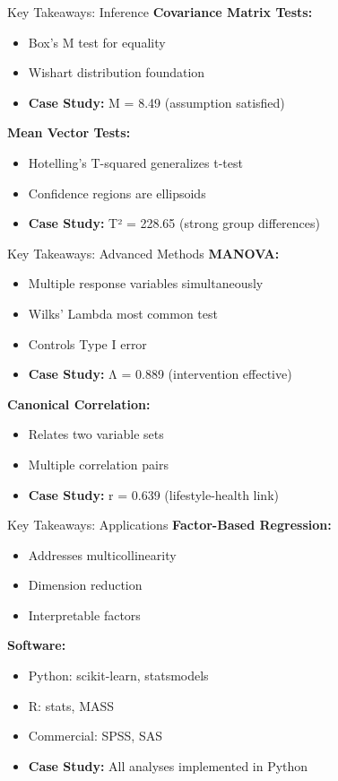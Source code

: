 \documentclass[aspectratio=169,ignorenonframetext]{beamer}
\begin{document}
\begin{frame}{Key Takeaways: Inference}
\textbf{Covariance Matrix Tests:}

\begin{itemize}
\item
  Box's M test for equality
\item
  Wishart distribution foundation
\item
  \textbf{Case Study:} M = 8.49 (assumption satisfied)
\end{itemize}

\textbf{Mean Vector Tests:}

\begin{itemize}
\item
  Hotelling's T-squared generalizes t-test
\item
  Confidence regions are ellipsoids
\item
  \textbf{Case Study:} T² = 228.65 (strong group differences)
\end{itemize}
\end{frame}

\begin{frame}{Key Takeaways: Advanced Methods}
\textbf{MANOVA:}

\begin{itemize}
\item
  Multiple response variables simultaneously
\item
  Wilks' Lambda most common test
\item
  Controls Type I error
\item
  \textbf{Case Study:} Λ = 0.889 (intervention effective)
\end{itemize}

\textbf{Canonical Correlation:}

\begin{itemize}
\item
  Relates two variable sets
\item
  Multiple correlation pairs
\item
  \textbf{Case Study:} r = 0.639 (lifestyle-health link)
\end{itemize}
\end{frame}

\begin{frame}{Key Takeaways: Applications}
\textbf{Factor-Based Regression:}

\begin{itemize}
\item
  Addresses multicollinearity
\item
  Dimension reduction
\item
  Interpretable factors
\end{itemize}

\textbf{Software:}

\begin{itemize}
\item
  Python: scikit-learn, statsmodels
\item
  R: stats, MASS
\item
  Commercial: SPSS, SAS
\item
  \textbf{Case Study:} All analyses implemented in Python
\end{itemize}
\end{frame}
\end{document}
